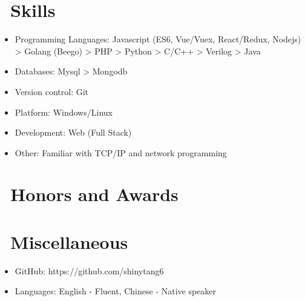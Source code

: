 \documentclass{resume}
\begin{document}

\section{\faCogs\ Skills}
\begin{itemize}[parsep=0.5ex]
  \item Programming Languages: Javascript (ES6, Vue/Vuex, React/Redux, Nodejs) > Golang (Beego) > PHP > Python > C/C++ > Verilog > Java
  \item Databases: Mysql > Mongodb
  \item Version control: Git
  \item Platform: Windows/Linux
  \item Development: Web (Full Stack)
  \item Other: Familiar with TCP/IP and network programming
\end{itemize}

\section{\faHeartO\ Honors and Awards}

\section{\faInfo\ Miscellaneous}
\begin{itemize}[parsep=0.5ex]
  \item GitHub: https://github.com/shinytang6
  \item Languages: English - Fluent, Chinese - Native speaker
\end{itemize}

%
%
\end{document}
